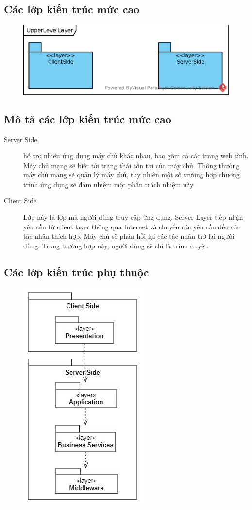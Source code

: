 \documentclass[./../main.tex]{subfiles}
\begin{document}
	\subsection{Các lớp kiến trúc mức cao}
	\begin{figure}[H]
		\centering
		\includegraphics{./images/UpperLevelLayer.eps}
	\end{figure}

	\subsection{Mô tả các lớp kiến trúc mức cao}
	\begin{description}
		\item[Server Side] hỗ trợ nhiều ứng dụng máy chủ khác nhau, bao gồm cả các trang web tĩnh. Máy chủ mạng sẽ biết tới trạng thái tồn tại của máy chủ. Thông thường máy chủ mạng sẽ quản lý máy chủ, tuy nhiên một số trường hợp chương trình ứng dụng sẽ đảm nhiệm một phần trách nhiệm này.
		\item[Client Side]  Lớp này là lớp mà người dùng truy cập ứng dụng. Server Layer tiếp nhận yêu cầu từ client layer thông qua Internet và chuyển các yêu cầu đến các tác nhân thích hợp. Máy chủ sẽ phản hồi lại các tác nhân trở lại  người dùng. Trong trường hợp này, người dùng sẽ chỉ là trình duyệt. 
	\end{description}
	\subsection{Các lớp kiến trúc phụ thuộc}
		\begin{figure}[H]
		\centering
		\includegraphics{./images/layer_and_dependencies.png}
	\end{figure}
\end{document}
